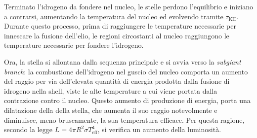 \documentclass[11pt, a4paper]{scrartcl}
\theoremstyle{style}
\theoremstyle{style1}
\numberwithin{equation}{subsection}
\begin{document}
Terminato l'idrogeno da fondere nel nucleo, le stelle perdono l'equilibrio e iniziano a contrarsi, aumentando la temperatura del nucleo ed evolvendo tramite $\tau _\text{KH}$. 
Durante questo processo, prima di raggiungere le temperature necessarie per innescare la fusione dell'elio, le regioni circostanti al nucleo raggiungono le temperature necessarie per fondere l'idrogeno.

Ora, la stella si allontana dalla sequenza principale e si avvia verso la \textit{subgiant branch}: la combustione dell'idrogeno nel guscio del nucleo comporta un aumento del raggio per via dell'elevata quantit\`a di energia prodotta dalla fusione di idrogeno nella shell, viste le alte temperature a cui viene portata dalla contrazione contro il nucleo.
Questo aumento di produzione di energia, porta una dilatazione della della stella, che aumenta il suo raggio notevolmente e diminuisce, meno bruscamente, la sua temperatura efficace.
Per questa ragione, secondo la legge $L = 4\pi R^2 \sigma T_\text{eff}^4$, si verifica un aumento della luminosit\`a.
\end{document}
